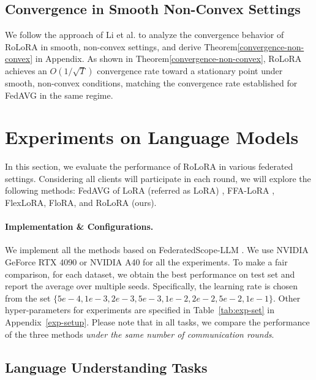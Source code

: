 \documentclass{article}
\theoremstyle{plain}
\theoremstyle{definition}
\theoremstyle{remark}
\begin{document}
\vspace{-0.3cm}
\subsection{Convergence in Smooth Non-Convex Settings}
\vspace{-0.2cm}
We follow the approach of Li et al.\cite{Li2020On} to analyze the convergence behavior of RoLoRA in smooth, non-convex settings, and derive Theorem\ref{convergence-non-convex} in Appendix. As shown in Theorem\ref{convergence-non-convex}, RoLoRA achieves an $O(1/\sqrt{T})$ convergence rate toward a stationary point under smooth, non-convex conditions, matching the convergence rate established for FedAVG in the same regime.


\vspace{-0.2cm}
\section{Experiments on Language Models}\label{exp}
\vspace{-0.2cm}
In this section, we evaluate the performance of RoLoRA in various federated settings. 
Considering all clients will participate in each round, we will explore the following methods: FedAVG of LoRA (referred as LoRA) \cite{zhang2023towards}, FFA-LoRA \cite{sun2024improving}, FlexLoRA\cite{bai2024federatedfinetuninglargelanguage}, FloRA\cite{wang2024florafederatedfinetuninglarge}, and RoLoRA (ours).

\vspace{-0.3cm}
\paragraph{Implementation \& Configurations.}We implement all the methods based on FederatedScope-LLM \cite{kuang2023federatedscopellm}. We use NVIDIA GeForce RTX 4090 or NVIDIA A40 for all the experiments. To make a fair comparison, for each dataset, we obtain the best performance on test set and report the average over multiple seeds. Specifically, the learning rate is chosen from the set $\{5e-4, 1e-3, 2e-3, 5e-3, 1e-2, 2e-2, 5e-2, 1e-1\}$. Other hyper-parameters for experiments are specified in Table~\ref{tab:exp-set} in Appendix~\ref{exp-setup}. Please note that in all tasks, we compare the performance of the three methods \textit{under the same number of communication rounds}.
\vspace{-0.2cm}
\subsection{Language Understanding Tasks} \label{exp-LU}
\vspace{-0.2cm}
\end{document}
